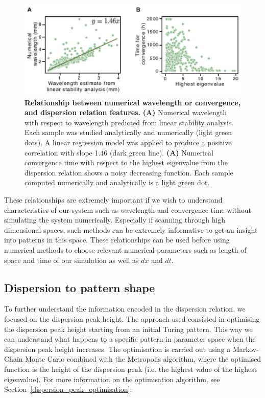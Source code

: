 \begin{figure}[H] %
    \centering
    \includegraphics[width=1\textwidth]{chapters/Chapter 1/dispersion_to_wavelength_convergence} %
    \caption{\textbf{Relationship between numerical wavelength or convergence, and dispersion relation features.} \textbf{(A)} Numerical wavelength with respect to wavelength predicted from linear stability analysis. Each sample was studied analytically and numerically (light green dots). A linear regression model was applied to produce a positive correlation with slope 1.46 (dark green line). \textbf{(A)} Numerical convergence time with respect to the highest eigenvalue from the dispersion relation shows a noisy decreasing function. Each sample computed numerically and analytically is a light green dot.}
    \label{fig:dispersion_to_wavelength_convergence} %
\end{figure}

These relationships are extremely important if we wish to understand characteristics of our system such as wavelength and convergence time without simulating the system numerically.
Especially if scanning through high dimensional spaces, such methods can be extremely informative to get an insight into patterns in this space.
These relationships can be used before using numerical methods to choose relevant numerical parameters such as length of space and time of our simulation as well as $dx$ and $dt$.

\subsection{Dispersion to pattern shape}
To further understand the information encoded in the dispersion relation, we focused on the dispersion peak height.
The approach used consisted in optimising the dispersion peak height starting from an initial Turing pattern.
This way we can understand what happens to a specific pattern in parameter space when the dispersion peak height increases.
The optimisation is carried out using a Markov-Chain Monte Carlo combined with the Metropolis algorithm, where the optimised function is the height of the dispersion peak (i.e. the highest value of the highest eigenvalue).
For more information on the optimisation algorithm, see Section~\ref{dispersion_peak_optimisation}.

